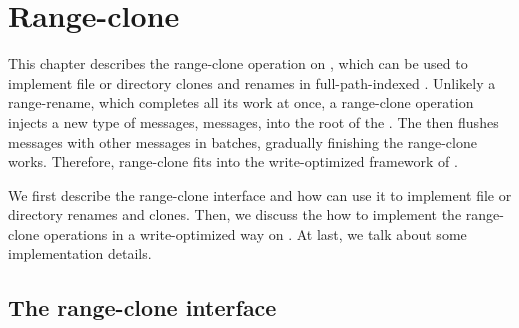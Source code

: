 \chapter{Range-clone}
\label{chap:clone}

This chapter describes the range-clone operation on \bets, which can be used
to implement file or directory clones and renames in full-path-indexed \betrfs.
Unlikely a range-rename, which completes all its work at once, a range-clone
operation injects a new type of messages, \goto messages,
into the root of the \bet.
The \bet then flushes \goto messages with other messages in batches, gradually
finishing the range-clone works.
Therefore, range-clone fits into the write-optimized framework of \bets.

We first describe the range-clone interface and how \betrfs can use it to
implement file or directory renames and clones.
Then, we discuss the how to implement the range-clone operations in a
write-optimized way on \bets.
At last, we talk about some implementation details.

\section{The range-clone interface}

